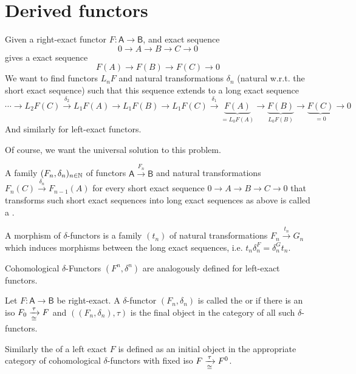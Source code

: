 \documentclass[fontsize=11pt,fleqn,a4paper]{scrartcl}
\begin{document}
\section{Derived functors}

\begin{remark}
Given a right-exact functor $F: \mathsf{A} \to \mathsf{B}$, and exact sequence
\[0\to A \to B \to C \to 0\]
gives a exact sequence
\[F(A) \to F(B) \to F(C) \to 0\]
We want to find functors $L_nF$ and natural transformations $\delta_n$ (natural w.r.t. the short exact sequence) such that this sequence extends to a long exact sequence
\[\cdots \to L_2F(C) \xrightarrow{\delta_2} L_1F(A) \to L_1F(B) \to L_1F(C) \xrightarrow{\delta_1} \underbrace{F(A)}_{=L_0F(A)} \to \underbrace{F(B)}_{L_0F(B)} \to \underbrace{F(C)}_{=0} \to 0\]
And similarly for left-exact functors.

Of course, we want the universal solution to this problem.
\end{remark}

\begin{definition}
A family $(F_n,\delta_n)_{n\in\mathbb{N}}$ of functors $\mathsf{A} \xrightarrow{F_n} \mathsf{B}$ and natural transformations $F_n(C) \xrightarrow{\delta_n} F_{n-1}(A)$ for every short exact sequence $0\to A\to B\to C\to 0$ that transforms such short exact sequences into long exact sequences as above is called a .

A morphism of $\delta$-functors is a family $(t_n)$ of natural transformations $F_n \xrightarrow{t_n} G_n$ which induces morphisms between the long exact sequences, i.e. $t_n\delta_n^F = \delta_n^G t_n$.

Cohomological $\delta$-Functors $(F^n,\delta^n)$ are analogously defined for left-exact functors.
\end{definition}

\begin{definition}
Let $F: \mathsf{A} \to \mathsf{B}$ be right-exact. A $\delta$-functor $(F_n,\delta_n)$ is called the  or  if there is an iso $F_0 \xrightarrow[\cong]{\tau} F$ and $((F_n,\delta_n),\tau)$ is the final object in the category of all such $\delta$-functors.

Similarly the  of a left exact $F$ is defined as an initial object in the appropriate category of cohomological $\delta$-functors with fixed iso $F \xrightarrow[\cong]{\tau} F^0$.
\end{definition}
\end{document}

